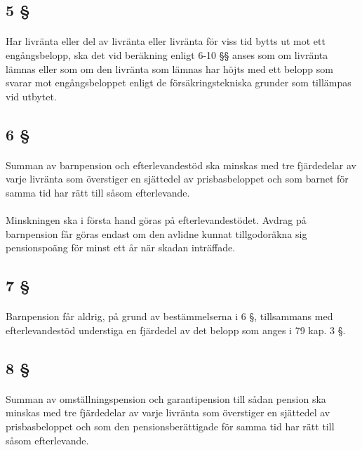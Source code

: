 \documentclass[a4paper,notitlepage,openany,10pt]{book}
\begin{document}
\subsection*{5 §}
\paragraph*{}
Har livränta eller del av livränta eller livränta för viss tid bytts ut mot ett engångsbelopp, ska det vid beräkning enligt 6-10 §§ anses som om livränta lämnas eller som om den livränta som lämnas har höjts med ett belopp som svarar mot engångsbeloppet enligt de försäkringstekniska grunder som tillämpas vid utbytet.
\subsection*{6 §}
\paragraph*{}
Summan av barnpension och efterlevandestöd ska minskas med tre fjärdedelar av varje livränta som överstiger en sjättedel av prisbasbeloppet och som barnet för samma tid har rätt till såsom efterlevande.
\paragraph*{}
Minskningen ska i första hand göras på efterlevandestödet.
Avdrag på barnpension får göras endast om den avlidne kunnat tillgodoräkna sig pensionspoäng för minst ett år när skadan inträffade.
\subsection*{7 §}
\paragraph*{}
Barnpension får aldrig, på grund av bestämmelserna i 6 §, tillsammans med efterlevandestöd understiga en fjärdedel av det belopp som anges i 79 kap. 3 §.
\subsection*{8 §}
\paragraph*{}
Summan av omställningspension och garantipension till sådan pension ska minskas med tre fjärdedelar av varje livränta som överstiger en sjättedel av prisbasbeloppet och som den pensionsberättigade för samma tid har rätt till såsom efterlevande.
\end{document}
